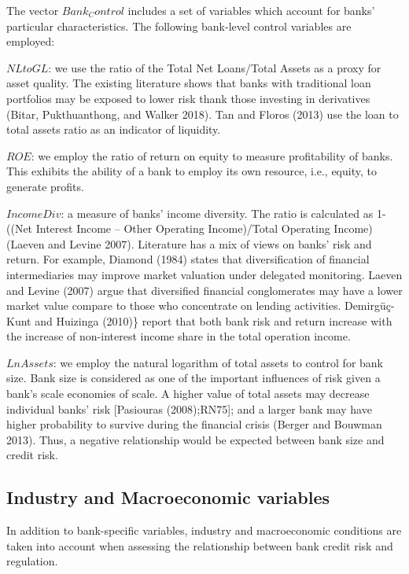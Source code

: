 \documentclass{article}
\begin{document}
The vector \(Bank_Control\) includes a set of variables which account
for banks' particular characteristics. The following bank-level control
variables are employed:

\(NL to GL\): we use the ratio of the Total Net Loans/Total Assets as a
proxy for asset quality. The existing literature shows that banks with
traditional loan portfolios may be exposed to lower risk thank those
investing in derivatives (Bitar, Pukthuanthong, and Walker 2018). Tan
and Floros (2013) use the loan to total assets ratio as an indicator of
liquidity.

\(ROE\): we employ the ratio of return on equity to measure
profitability of banks. This exhibits the ability of a bank to employ
its own resource, i.e., equity, to generate profits.

\(Income Div\): a measure of banks' income diversity. The ratio is
calculated as 1-((Net Interest Income -- Other Operating Income)/Total
Operating Income) (Laeven and Levine 2007). Literature has a mix of
views on banks' risk and return. For example, Diamond (1984) states that
diversification of financial intermediaries may improve market valuation
under delegated monitoring. Laeven and Levine (2007) argue that
diversified financial conglomerates may have a lower market value
compare to those who concentrate on lending activities. Demirgüç-Kunt
and Huizinga (2010)\} report that both bank risk and return increase
with the increase of non-interest income share in the total operation
income.

\(LnAssets\): we employ the natural logarithm of total assets to control
for bank size. Bank size is considered as one of the important
influences of risk given a bank's scale economies of scale. A higher
value of total assets may decrease individual banks' risk {[}Pasiouras
(2008);RN75{]}; and a larger bank may have higher probability to survive
during the financial crisis (Berger and Bouwman 2013). Thus, a negative
relationship would be expected between bank size and credit risk.

\hypertarget{industry-and-macroeconomic-variables}{%
\subsection{Industry and Macroeconomic
variables}\label{industry-and-macroeconomic-variables}}

In addition to bank-specific variables, industry and macroeconomic
conditions are taken into account when assessing the relationship
between bank credit risk and regulation.
\end{document}
